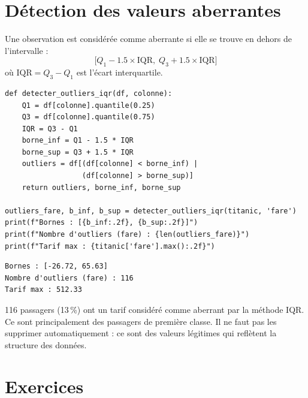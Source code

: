 \section{D\'etection des valeurs aberrantes}

\begin{definition}
Une observation est consid\'er\'ee comme aberrante si elle se trouve en dehors de l'intervalle :
\[
\bigl[Q_1 - 1.5 \times \text{IQR},\; Q_3 + 1.5 \times \text{IQR}\bigr]
\]
o\`u $\text{IQR} = Q_3 - Q_1$ est l'\'ecart interquartile.
\end{definition}

\begin{codeblock}[title=\textbf{Python}]
\begin{verbatim}
def detecter_outliers_iqr(df, colonne):
    Q1 = df[colonne].quantile(0.25)
    Q3 = df[colonne].quantile(0.75)
    IQR = Q3 - Q1
    borne_inf = Q1 - 1.5 * IQR
    borne_sup = Q3 + 1.5 * IQR
    outliers = df[(df[colonne] < borne_inf) |
                  (df[colonne] > borne_sup)]
    return outliers, borne_inf, borne_sup

outliers_fare, b_inf, b_sup = detecter_outliers_iqr(titanic, 'fare')
print(f"Bornes : [{b_inf:.2f}, {b_sup:.2f}]")
print(f"Nombre d'outliers (fare) : {len(outliers_fare)}")
print(f"Tarif max : {titanic['fare'].max():.2f}")
\end{verbatim}
\end{codeblock}

\begin{codeoutput}
\begin{verbatim}
Bornes : [-26.72, 65.63]
Nombre d'outliers (fare) : 116
Tarif max : 512.33
\end{verbatim}
\end{codeoutput}

\begin{remarque}
116 passagers (13\,\%) ont un tarif consid\'er\'e comme aberrant par la m\'ethode IQR. Ce sont principalement des passagers de premi\`ere classe. Il ne faut pas les supprimer automatiquement : ce sont des valeurs l\'egitimes qui refl\`etent la structure des donn\'ees.
\end{remarque}

\section{Exercices}

